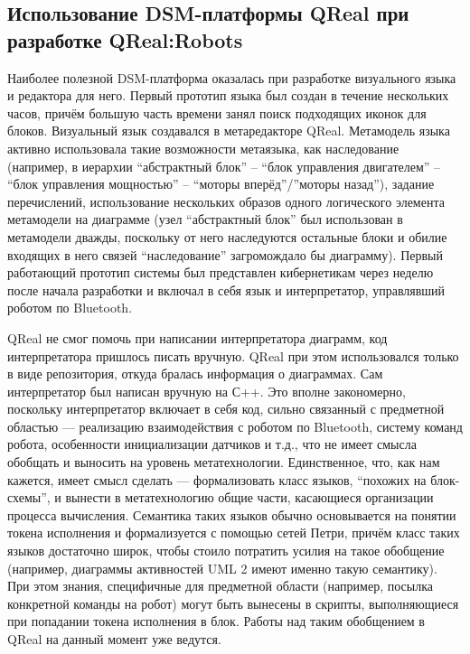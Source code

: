 \documentclass[a4]{article}
\begin{document}
\subsection{Использование DSM-платформы QReal при разработке QReal:Robots}

Наиболее полезной DSM-платформа оказалась при разработке визуального языка и редактора для него. Первый прототип языка был создан в течение нескольких часов, причём большую часть времени занял поиск подходящих иконок для блоков. Визуальный язык создавался в метаредакторе QReal. Метамодель языка активно использовала такие возможности метаязыка, как наследование (например, в иерархии “абстрактный блок” -- “блок управления двигателем” -- “блок управления мощностью” -- “моторы вперёд”/”моторы назад”), задание перечислений, использование нескольких образов одного логического элемента метамодели на диаграмме (узел “абстрактный блок” был использован в метамодели дважды, поскольку от него наследуются остальные блоки и обилие входящих в него связей “наследование” загромождало бы диаграмму). Первый работающий прототип системы был представлен кибернетикам через неделю после начала разработки и включал в себя язык и интерпретатор, управлявший роботом по Bluetooth.

QReal не смог помочь при написании интерпретатора диаграмм, код интерпретатора пришлось писать вручную. QReal при этом использовался только в виде репозитория, откуда бралась информация о диаграммах. Сам интерпретатор был написан вручную на С++. Это вполне закономерно, поскольку интерпретатор включает в себя код, сильно связанный с предметной областью --- реализацию взаимодействия с роботом по Bluetooth, систему команд робота, особенности инициализации датчиков и т.д., что не имеет смысла обобщать и выносить на уровень метатехнологии. Единственное, что, как нам кажется, имеет смысл сделать --- формализовать класс языков, “похожих на блок-схемы”, и вынести в метатехнологию общие части, касающиеся организации процесса вычисления. Семантика таких языков обычно основывается на понятии токена исполнения и формализуется с помощью сетей Петри, причём класс таких языков достаточно широк, чтобы стоило потратить усилия на такое обобщение (например, диаграммы активностей UML 2 имеют именно такую семантику). При этом знания, специфичные для предметной области (например, посылка конкретной команды на робот) могут быть вынесены в скрипты, выполняющиеся при попадании токена исполнения в блок. Работы над таким обобщением в QReal на данный момент уже ведутся.
\end{document}
